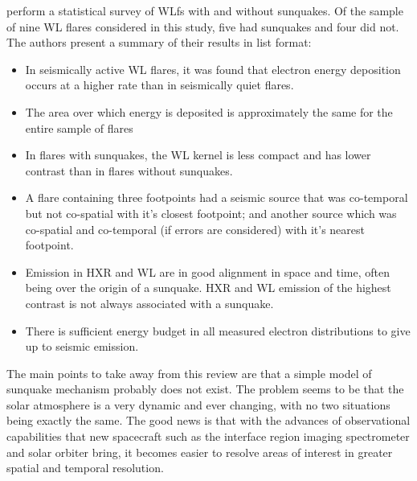 \documentclass[11pt]{article}
\begin{document}
\cite{2012SoPh..277..317P} perform a statistical survey of WLfs with and without sunquakes. Of the sample of nine WL flares considered in this study, five had sunquakes and four did not. The authors present a summary of their results in list format:
\begin{itemize}
\item In seismically active WL flares, it was found that electron energy deposition occurs at a higher rate than in seismically quiet flares.
\item The area over which energy is deposited is approximately the same for the entire sample of flares
\item In flares with sunquakes, the WL kernel is less compact and has lower contrast than in flares without sunquakes.
\item A flare containing three footpoints had a seismic source that was co-temporal but not co-spatial with it's closest footpoint; and another source which was co-spatial and co-temporal (if errors are considered) with it's nearest footpoint.
\item Emission in HXR and WL are in good alignment in space and time, often being over the origin of a sunquake. HXR and WL emission of the highest contrast is not always associated with a sunquake. 
\item There is sufficient energy budget in all measured electron distributions to give up to seismic emission.
\end{itemize}

The main points to take away from this review are that a simple model of sunquake mechanism probably does not exist. The problem seems to be that the solar atmosphere is a very dynamic and ever changing, with no two situations being exactly the same. The good news is that with the advances of observational capabilities that new spacecraft such as the interface region imaging spectrometer and solar orbiter bring, it becomes easier to resolve areas of interest in greater spatial and temporal resolution. \\ \\    
\end{document}
